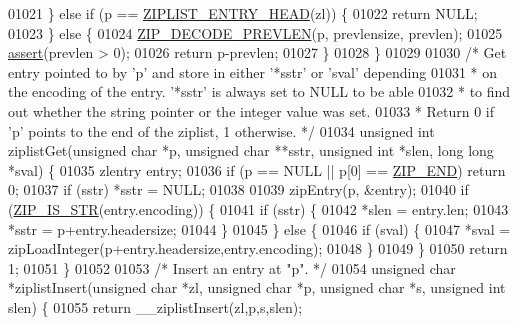 \begin{DoxyCode}
{{01021     \} \textcolor{keywordflow}{else} \textcolor{keywordflow}{if} (p == \hyperlink{ziplist_8c_a4f6c9857a0ae335f2c4b214b63b5a6c8}{ZIPLIST\_ENTRY\_HEAD}(zl)) \{
01022         \textcolor{keywordflow}{return} NULL;
01023     \} \textcolor{keywordflow}{else} \{
01024         \hyperlink{ziplist_8c_a3e5b2bc4707dc1097db2726494cc3728}{ZIP\_DECODE\_PREVLEN}(p, prevlensize, prevlen);
01025         \hyperlink{redisassert_8h_a993abaa2c168852c1592879472938781}{assert}(prevlen > 0);
01026         \textcolor{keywordflow}{return} p-prevlen;
01027     \}
01028 \}
01029 
01030 \textcolor{comment}{/* Get entry pointed to by 'p' and store in either '*sstr' or 'sval' depending}
01031 \textcolor{comment}{ * on the encoding of the entry. '*sstr' is always set to NULL to be able}
01032 \textcolor{comment}{ * to find out whether the string pointer or the integer value was set.}
01033 \textcolor{comment}{ * Return 0 if 'p' points to the end of the ziplist, 1 otherwise. */}
01034 \textcolor{keywordtype}{unsigned} \textcolor{keywordtype}{int} ziplistGet(\textcolor{keywordtype}{unsigned} \textcolor{keywordtype}{char} *p, \textcolor{keywordtype}{unsigned} \textcolor{keywordtype}{char} **sstr, \textcolor{keywordtype}{unsigned} \textcolor{keywordtype}{int} *slen, \textcolor{keywordtype}{long} \textcolor{keywordtype}{long} *sval) \{
01035     zlentry entry;
01036     \textcolor{keywordflow}{if} (p == NULL || p[0] == \hyperlink{ziplist_8c_a31a8f9d5b5bad75318741cfca5de5ea8}{ZIP\_END}) \textcolor{keywordflow}{return} 0;
01037     \textcolor{keywordflow}{if} (sstr) *sstr = NULL;
01038 
01039     zipEntry(p, &entry);
01040     \textcolor{keywordflow}{if} (\hyperlink{ziplist_8c_a2cb79e478d5bda74592c92230cfd6761}{ZIP\_IS\_STR}(entry.encoding)) \{
01041         \textcolor{keywordflow}{if} (sstr) \{
01042             *slen = entry.len;
01043             *sstr = p+entry.headersize;
01044         \}
01045     \} \textcolor{keywordflow}{else} \{
01046         \textcolor{keywordflow}{if} (sval) \{
01047             *sval = zipLoadInteger(p+entry.headersize,entry.encoding);
01048         \}
01049     \}
01050     \textcolor{keywordflow}{return} 1;
01051 \}
01052 
01053 \textcolor{comment}{/* Insert an entry at "p". */}
01054 \textcolor{keywordtype}{unsigned} \textcolor{keywordtype}{char} *ziplistInsert(\textcolor{keywordtype}{unsigned} \textcolor{keywordtype}{char} *zl, \textcolor{keywordtype}{unsigned} \textcolor{keywordtype}{char} *p, \textcolor{keywordtype}{unsigned} \textcolor{keywordtype}{char} *s, \textcolor{keywordtype}{unsigned} \textcolor{keywordtype}{int} slen)
       \{
01055     \textcolor{keywordflow}{return} \_\_ziplistInsert(zl,p,s,slen);
}}
\end{DoxyCode}
